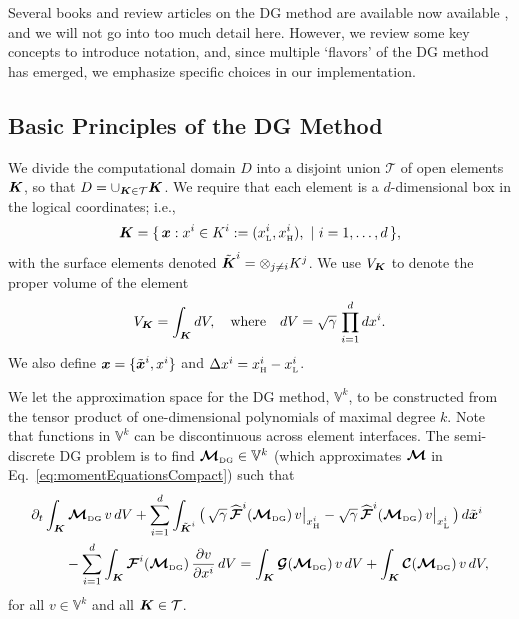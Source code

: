 \documentclass[10pt,preprint]{aastex}
\newcommand{\dx}{\Delta x}
\newcommand{\sumx}{\sum_{i=1}^{d}}
\begin{document}
Several books and review articles on the DG method are available now available \citep[see, e.g.,][]{cockburnShu_2001,hesthavenWarburton_2008}, and we will not go into too much detail here.  
However, we review some key concepts to introduce notation, and, since multiple `flavors' of the DG method has emerged, we emphasize specific choices in our implementation.  

\subsection{Basic Principles of the DG Method}

We divide the computational domain $D$ into a disjoint union $\mathcal{T}$ of open elements $\boldsymbol{K}$, so that $D = \cup_{\boldsymbol{K} \in \mathcal{T}}\boldsymbol{K}$.  
We require that each element is a $d$-dimensional box in the logical coordinates; i.e.,
\begin{equation}
  \boldsymbol{K}=\{\,\boldsymbol{x} : x^{i} \in K^{i} := (x_{\mbox{\tiny L}}^{i},x_{\mbox{\tiny H}}^{i}),~|~i=1,\ldots,d\,\}, 
\end{equation}
with the surface elements denoted $\tilde{\boldsymbol{K}}^{i}=\otimes_{j\ne i}K^{j}$.  
We use $V_{\boldsymbol{K}}$ to denote the proper volume of the element
\begin{equation}
  V_{\boldsymbol{K}} = \int_{\boldsymbol{K}}dV, \quad\text{where}\quad dV = \sqrt{\gamma}\,\prod_{i=1}^{d}dx^{i}.  
\end{equation}
We also define $\boldsymbol{x}=\{\tilde{\boldsymbol{x}}^{i},x^{i}\}$ and $\dx^{i}=\xH^{i}-\xL^{i}$.  

We let the approximation space for the DG method, $\mathbb{V}^{k}$, to be constructed from the tensor product of one-dimensional polynomials of maximal degree $k$.  
Note that functions in $\mathbb{V}^{k}$ can be discontinuous across element interfaces.  
The semi-discrete DG problem is to find $\boldsymbol{\mathcal{M}}_{\mbox{\tiny DG}}\in\mathbb{V}^{k}$ (which approximates $\boldsymbol{\mathcal{M}}$ in Eq.~\eqref{eq:momentEquationsCompact}) such that \citep[cf.][]{cockburnShu_2001}
\begin{align}
  &\partial_{t}\int_{\bK}\bcM_{\DG}\,v\,dV
  +\sumx\int_{\tilde{\bK}^{i}}
  \big(\,
    \sqrt{\gamma}\,\widehat{\bcF}^{i}(\bcM_{\DG})\,v\big|_{\xH^{i}}
    -\sqrt{\gamma}\,\widehat{\bcF}^{i}(\bcM_{\DG})\,v\big|_{\xL^{i}}\,\big)\,d\tilde{\bx}^{i} \nonumber \\
  &\hspace{24pt}
  -\sumx\int_{\bK}\bcF^{i}(\bcM_{\DG})\,\pderiv{v}{x^{i}}\,dV
  =\int_{\bK}\bcG(\bcM_{\DG})\,v\,dV+\int_{\bK}\bcC(\bcM_{\DG})\,v\,dV,
  \label{eq:semidiscreteDG}
\end{align}
for all $v\in\mathbb{V}^{k}$ and all $\boldsymbol{K}\in\mathcal{T}$.  
\end{document}
